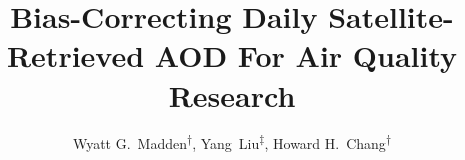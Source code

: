 \documentclass[12pt]{article}
\title{Bias-Correcting Daily Satellite-Retrieved AOD For Air Quality Research}
\author{Wyatt G.\relax ~Madden\textsuperscript{$\dagger$}, Yang\relax ~Liu\textsuperscript{$\ddagger$}, Howard H.\relax ~Chang\textsuperscript{$\dagger$}}
\date{}
\newif\ifwhole
\begin{document}
\maketitle

\ifwhole
  
  
  

\else
  
\fi



\printbibliography
\end{document}
